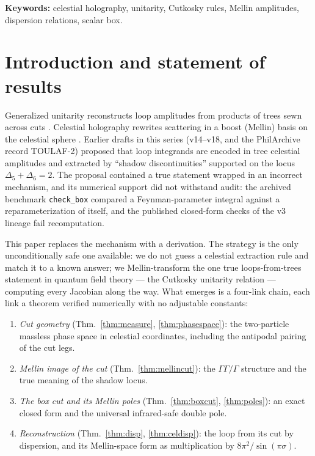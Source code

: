 \documentclass[12pt,a4paper]{article}
\theoremstyle{plain}
\theoremstyle{definition}
\theoremstyle{remark}
\begin{document}
\medskip
\noindent\textbf{Keywords:} celestial holography, unitarity, Cutkosky
rules, Mellin amplitudes, dispersion relations, scalar box.

\tableofcontents
\newpage

\section{Introduction and statement of results}

Generalized unitarity reconstructs loop amplitudes from products of
trees sewn across cuts \cite{Bern1994}.  Celestial holography rewrites
scattering in a boost (Mellin) basis on the celestial sphere
\cite{Pasterski2017,Raclariu2021}.  Earlier drafts in this series
(v14--v18, and the PhilArchive record TOULAF-2) proposed that loop
integrands are encoded in tree celestial amplitudes and extracted by
``shadow discontinuities'' supported on the locus
$\Delta_5+\Delta_6=2$.  The proposal contained a true statement wrapped
in an incorrect mechanism, and its numerical support did not withstand
audit: the archived benchmark \texttt{check\_box} compared a
Feynman-parameter integral against a reparameterization of itself, and
the published closed-form checks of the v3 lineage fail recomputation.

This paper replaces the mechanism with a derivation.  The strategy is
the only unconditionally safe one available: we do not guess a
celestial extraction rule and match it to a known answer; we
Mellin-transform the one true loops-from-trees statement in quantum
field theory --- the Cutkosky unitarity relation --- computing every
Jacobian along the way.  What emerges is a four-link chain, each link a
theorem verified numerically with no adjustable constants:

\begin{enumerate}
\item[\textbf{L1.}] \emph{Cut geometry} (Thm.~\ref{thm:measure},
\ref{thm:phasespace}): the two-particle massless phase space in
celestial coordinates, including the antipodal pairing of the cut legs.
\item[\textbf{L2.}] \emph{Mellin image of the cut}
(Thm.~\ref{thm:mellincut}): the
$\Gamma\Gamma/\Gamma$ structure and the true meaning of the shadow
locus.
\item[\textbf{L3.}] \emph{The box cut and its Mellin poles}
(Thm.~\ref{thm:boxcut}, \ref{thm:poles}): an exact closed form and the
universal infrared-safe double pole.
\item[\textbf{L4.}] \emph{Reconstruction} (Thm.~\ref{thm:disp},
\ref{thm:celdisp}): the loop from its cut by dispersion, and its
Mellin-space form as multiplication by $8\pi^2/\sin(\pi\sigma)$.
\end{enumerate}
\end{document}
